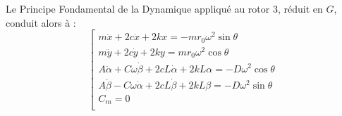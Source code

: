 \begin{multicols}{2}
Le Principe Fondamental de la Dynamique appliqué au rotor 3, réduit en $G$,
conduit alors à :
$$
\left[
\begin{array}{l}
m\ddot{x}+2c\dot{x}+2kx =-mr_0\omega^2 \sin \theta \\
m\ddot{y}+2c\dot{y}+2ky = mr_0\omega^2 \cos \theta \\
A\ddot{\alpha}+C\omega \dot{\beta }+2cL\dot{\alpha}+2kL\alpha =-D\omega^2 \cos \theta \\
A\ddot{\beta} - C\omega \dot{\alpha}+2cL\dot{\beta}+2kL\beta =-D\omega^2 \sin \theta \\
C_m=0 \\
\end{array}
\right.
$$

\subparagraph{}
\textit{}
\ifprof
\begin{corrige}
\end{corrige}
\else
\fi


\subparagraph{}
\textit{}
\ifprof
\begin{corrige}
\end{corrige}
\else
\fi



\ifprof
\else
\end{multicols}
\fi

